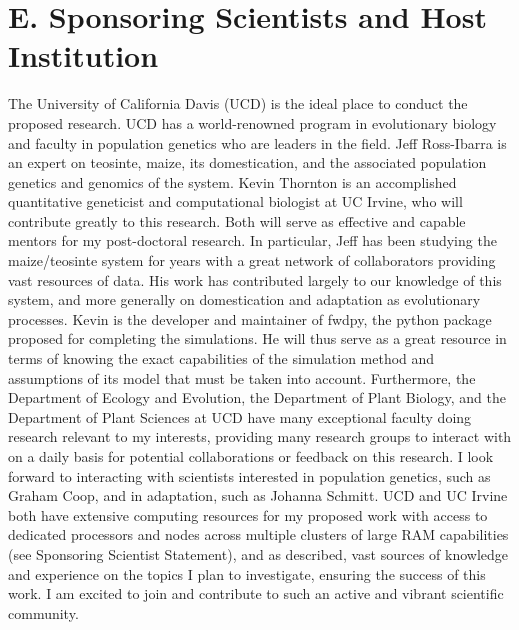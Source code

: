 \section*{E. Sponsoring Scientists and Host Institution}\vspace{-1ex}

The University of California Davis (UCD) is the ideal place to conduct the proposed research. UCD has a world-renowned program in evolutionary biology and faculty in population genetics who are leaders in the field. Jeff Ross\--Ibarra is an expert on teosinte, maize, its domestication, and the associated population genetics and genomics of the system. Kevin Thornton is an accomplished quantitative geneticist and computational biologist at UC Irvine, who will contribute greatly to this research. Both will serve as effective and capable mentors for my post-doctoral research. In particular, Jeff has been studying the maize\//teosinte system for years with a great network of collaborators providing vast resources of data. His work has contributed largely to our knowledge of this system, and more generally on domestication and adaptation as evolutionary processes. Kevin is the developer and maintainer of fwdpy, the python package proposed for completing the simulations. He will thus serve as a great resource in terms of knowing the exact capabilities of the simulation method and assumptions of its model that must be taken into account. Furthermore, the Department of Ecology and Evolution, the Department of Plant Biology, and the Department of Plant Sciences at UCD have many exceptional faculty doing research relevant to my interests, providing many research groups to interact with on a daily basis for potential collaborations or feedback on this research. I look forward to interacting with scientists interested in population genetics, such as Graham Coop, and in adaptation, such as Johanna Schmitt. %
UCD and UC Irvine both have extensive computing resources for my proposed work with access to dedicated processors and nodes across multiple clusters of large RAM capabilities (see Sponsoring Scientist Statement), and as described, vast sources of knowledge and experience on the topics I plan to investigate, ensuring the success of this work. I am excited to join and contribute to such an active and vibrant scientific community.\vspace{-3ex}

